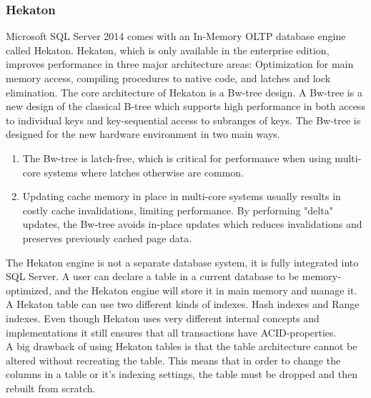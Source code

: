 \documentclass{cslthse-msc}
\begin{document}
\subsubsection{Hekaton}
Microsoft SQL Server 2014 comes with an In-Memory OLTP database engine called Hekaton. Hekaton, which is only available in the enterprise edition, improves performance in three major architecture areas: Optimization for main memory access, compiling procedures to native code, and latches and lock elimination. The core architecture of Hekaton is a Bw-tree design\cite{Levandoski14}. A Bw-tree is a new design of the classical B-tree which supports high performance in both access to individual keys and key-sequential access to subranges of keys. The Bw-tree is designed for the new hardware environment in two main ways. 
\begin{enumerate}
\item The Bw-tree is latch-free, which is critical for performance when using multi-core systems where latches otherwise are common.
\item Updating cache memory in place in multi-core systems usually results in costly cache invalidations, limiting performance. By performing "delta" updates, the Bw-tree avoids in-place updates which reduces invalidations and preserves previously cached page data.
\end{enumerate} 
The Hekaton engine is not a separate database system, it is fully integrated into SQL Server. A user can declare a table in a current database to be memory-optimized, and the Hekaton engine will store it in main memory and manage it. A Hekaton table can use two different kinds of indexes. Hash indexes and Range indexes.  Even though Hekaton uses very different internal concepts and implementations it still ensures that all transactions have ACID-properties. \\
A big drawback of using Hekaton tables is that the table architecture cannot be altered without recreating the table. This means that in order to change the columns in a table or it's indexing settings, the table must be dropped and then rebuilt from scratch.
\end{document}
